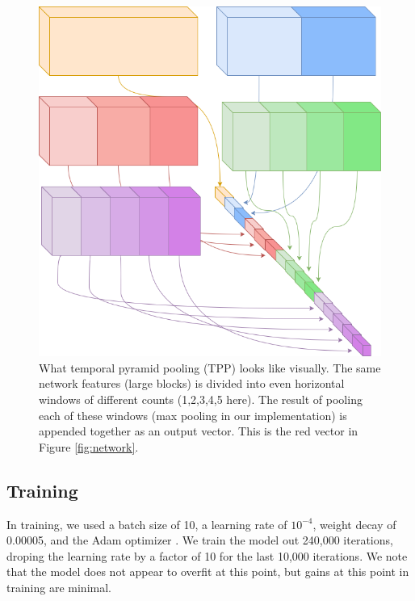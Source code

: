 \documentclass[ms,electronic,twosidetoc,letterpaper,chaptercenter,parttop,lof,lot]{byumsphd}
\begin{document}
\begin{figure}[t]
    \centering
    \includegraphics[width=.55\textwidth]{TPP_example}
    \caption{What temporal pyramid pooling (TPP) looks like visually. The same network features (large blocks) is divided into even horizontal windows of different counts (1,2,3,4,5 here). The result of pooling each of these windows (max pooling in our implementation) is appended together as an output vector. This is the red vector in Figure \ref{fig:network}.}
    \label{fig:TPP_example}
\end{figure}

\subsection{Training}

In training, we used a batch size of 10, a learning rate of $10^{-4}$, weight decay of 0.00005, and the Adam optimizer \cite{adam}.
We train the model out 240,000 iterations, droping the learning rate by a factor of 10 for the last 10,000 iterations. We note that the model does not appear to overfit at this point, but gains at this point in training are minimal.
\end{document}
